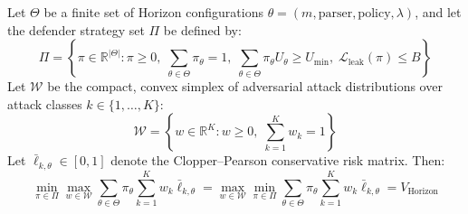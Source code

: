 \begin{theorem}
Let $\Theta$ be a finite set of Horizon configurations $\theta = (m, \text{parser}, \text{policy}, \lambda)$, and let the defender strategy set $\Pi$ be defined by:
\begin{equation}
    \Pi = \left\{ \pi \in \mathbb{R}^{|\Theta|} : \pi \ge 0, \; \sum_{\theta \in \Theta} \pi_\theta = 1, \; \sum_{\theta \in \Theta} \pi_\theta U_\theta \ge U_{\min}, \; \mathcal{L}_{\mathrm{leak}}(\pi) \le B \right\}
\end{equation}
Let $\mathcal{W}$ be the compact, convex simplex of adversarial attack distributions over attack classes $k \in \{1, \dots, K\}$:
\begin{equation}
    \mathcal{W} = \left\{ w \in \mathbb{R}^K : w \ge 0, \; \sum_{k=1}^K w_k = 1 \right\}
\end{equation}
Let $\bar{\ell}_{k, \theta} \in [0, 1]$ denote the Clopper--Pearson conservative risk matrix. Then:
\begin{equation}
    \min_{\pi \in \Pi} \max_{w \in \mathcal{W}} \sum_{\theta \in \Theta} \pi_\theta \sum_{k=1}^K w_k \bar{\ell}_{k, \theta} = \max_{w \in \mathcal{W}} \min_{\pi \in \Pi} \sum_{\theta \in \Theta} \pi_\theta \sum_{k=1}^K w_k \bar{\ell}_{k, \theta} = V_{\mathrm{Horizon}}
\end{equation}
\end{theorem}

